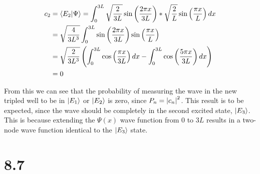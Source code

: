 \documentclass[10pt]{article} %
\begin{document}
\begin{align*}
  c_2 &= \braket{E_2}{\Psi} = \int_0^{3L} \sqrt{\frac{2}{3L}}\sin\left(\frac{2\pi x}{3L}\right)*
  \sqrt{\frac{2}{L}}\sin\left(\frac{\pi x}{L}\right)dx\\
  &= \sqrt{\frac{4}{3L^3}}\int_0^{3L}
  \sin\left(\frac{2\pi x}{3L}\right)\sin\left(\frac{\pi x}{L}\right)\\
  &= \sqrt{\frac{2}{3L^3}}\left(\int_0^{3L} \cos\left(\frac{\pi x}{3L}\right)dx
  - \int_0^{3L} \cos\left(\frac{5\pi x}{3L}\right)dx\right)\\
  &= 0\\
\end{align*}

From this we can see that the probability of measuring the wave in the new tripled well to be in
$\ket{E_1}$ or $\ket{E_2}$ is zero, since $P_n = \abs{c_n}^2$. This result is to be expected, since
the wave should be completely in the second excited state, $\ket{E_3}$. This is because extending
the $\Psi(x)$ wave function from $0$ to $3L$ results in a two-node wave function identical to the
$\ket{E_3}$ state.\\

\section{8.7}
\end{document}
